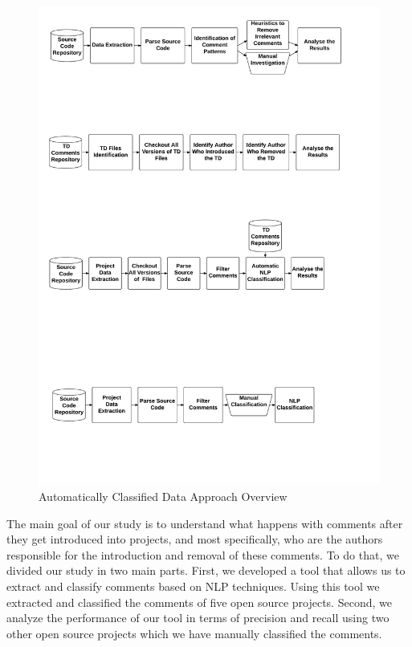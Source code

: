 
\begin{figure}[thb!]
  \centering
  \includegraphics[width=1\textwidth]{figures/automatically_classified_data_approach2.pdf}
  \caption{Automatically Classified Data Approach Overview}
  \label{fig:automatically_classified_data_approach_overview}
\end{figure}

The main goal of our study is to understand what happens with \SATD comments after they get introduced into projects, and most specifically, who are the authors responsible for the introduction and removal of these comments. To do that, we divided our study in two main parts. First, we developed a tool that allows us to extract and classify \SATD comments based on NLP techniques. Using this tool we extracted and classified the comments of five open source projects. Second, we analyze the performance of our tool in terms of precision and recall using two other open source projects which we have manually classified the \SATD comments. 

